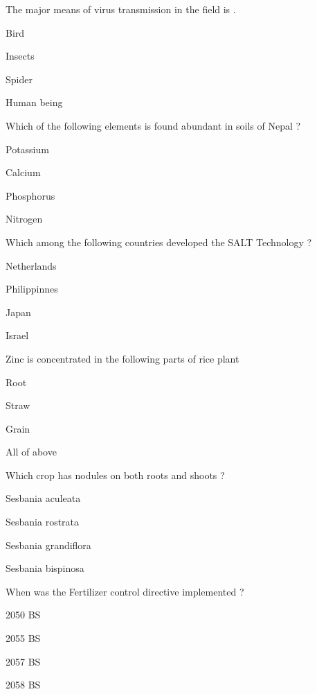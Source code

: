 \begin{questions}
\question The major means of virus transmission in the field is \fillin[][3cm].
\begin{items}
\item Bird
\item* Insects
\item Spider
\item Human being
\end{items}

\question Which of the following elements is found abundant in soils of Nepal ?
\begin{items}
\item* Potassium
\item Calcium
\item Phosphorus
\item Nitrogen
\end{items}

\question Which among the following countries developed the SALT Technology ?
\begin{items}
\item Netherlands
\item* Philippinnes
\item Japan
\item Israel
\end{items}

\question Zinc is concentrated in the following parts of rice plant
\begin{items}
\item Root
\item Straw
\item* Grain
\item All of above
\end{items}

\question Which crop has nodules on both roots and shoots ?
\begin{items}
\item Sesbania aculeata
\item* Sesbania rostrata
\item Sesbania grandiflora
\item Sesbania bispinosa
\end{items}

\question When was the Fertilizer control directive implemented ?
\begin{items}
\item 2050 BS
\item* 2055 BS
\item 2057 BS
\item 2058 BS
\end{items}


\end{questions}
